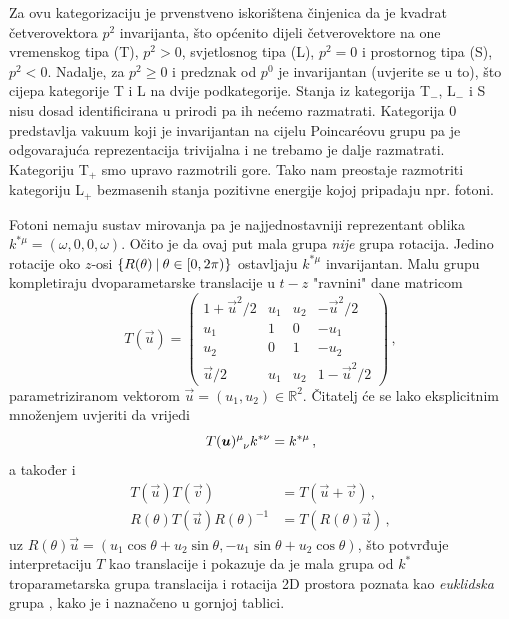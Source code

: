 Za ovu kategorizaciju je prvenstveno iskorištena činjenica da je
kvadrat četverovektora $p^2$ invarijanta, što općenito dijeli četverovektore
na one vremenskog tipa (T), $p^2>0$, svjetlosnog tipa (L), $p^2=0$ i prostornog tipa (S),
$p^2<0$.
Nadalje, za  $p^2 \ge 0$ i predznak od $p^0$ je invarijantan (uvjerite se u to),
što cijepa kategorije T i L na dvije podkategorije.
Stanja iz kategorija T$_-$, L$_-$ i S nisu dosad identificirana u prirodi pa ih
nećemo razmatrati.
Kategorija 0 predstavlja vakuum koji je invarijantan na cijelu Poincar\'{e}ovu
grupu pa je odgovarajuća reprezentacija trivijalna i ne trebamo je
dalje razmatrati.
Kategoriju T$_+$ smo upravo razmotrili gore.
Tako nam preostaje razmotriti kategoriju L$_+$ bezmasenih stanja pozitivne
energije kojoj pripadaju npr. fotoni.

Fotoni nemaju sustav mirovanja pa je najjednostavniji reprezentant
oblika $k^{*\mu} = (\omega, 0, 0, \omega)$. Očito je da ovaj put
mala grupa \emph{nije} grupa rotacija. Jedino rotacije oko $z$-osi
$\{R(\theta) \: | \: \theta \in [0, 2\pi)\}$ ostavljaju $k^{*\mu}$
invarijantan. Malu grupu kompletiraju dvoparametarske translacije
u $t-z$ "ravnini" dane matricom
\begin{equation}
  T(\vec{u}) = \begin{pmatrix}
      1+\vec{u}^2/2 & u_1 & u_2 & -\vec{u}^2/2 \\
u_1 & 1 & 0 & -u_1 \\
u_2 & 0 & 1 & -u_2 \\
\vec{u}/2 & u_1 & u_2 & 1-\vec{u}^2/2
  \end{pmatrix} \,,
    \label{eq:defTu}
\end{equation}
parametriziranom vektorom $\vec{u} = (u_1, u_2) \in \mathbb{R}^2$.
Čitatelj će se lako eksplicitnim množenjem uvjeriti da vrijedi
\begin{equation}
    \tensor{T(\vec{u})}{^{\mu}_{\nu}} k^{*\nu} = k^{*\mu} \,,
\end{equation}
a također i
\begin{align}
    T(\vec{u}) T(\vec{v}) &= T(\vec{u} + \vec{v}) \,, \\
    R(\theta) T(\vec{u}) R(\theta)^{-1} &= T(R(\theta)\vec{u}) \,,
\end{align}
uz $R(\theta)\vec{u} = (u_1\cos\theta + u_2 \sin\theta, -u_1\sin\theta+u_2\cos\theta)$,
što potvrđuje interpretaciju $T$ kao translacije i pokazuje da je mala grupa
od $k^{*}$ troparametarska grupa translacija i rotacija 2D prostora poznata
kao \emph{euklidska} grupa , kako je i naznačeno u gornjoj tablici.
